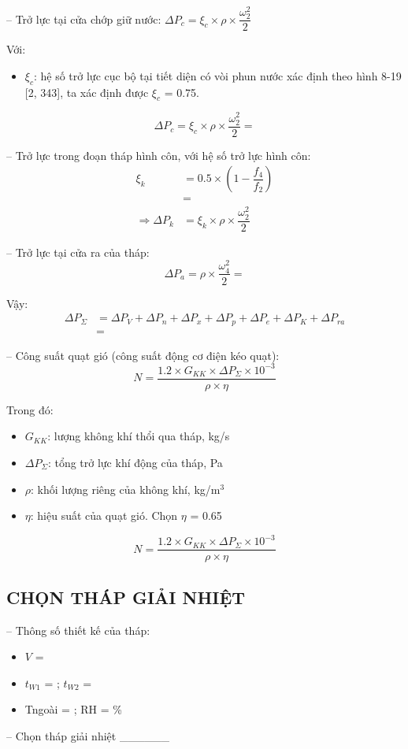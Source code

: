 -- Trở lực tại cửa chớp giữ nước: $\Delta P_{c} = \xi_{c}\times\rho\times\dfrac{\omega_{2}^2}{2}$

Với:
\begin{itemize}
	\item $\xi_{c}$: hệ số trở lực cục bộ tại tiết diện có vòi phun nước xác định theo hình 8-19 [2, 343], ta xác định được $\xi_{c}$ = 0.75.
\end{itemize}
\begin{equation*}
	\Delta P_{c} = \xi_{c}\times\rho\times\dfrac{\omega_{2}^2}{2} = 
\end{equation*}

-- Trở lực trong đoạn tháp hình côn, với hệ số trở lực hình côn:
\begin{equation*}
	\begin{split}
		\xi_{k} &= 0.5\times\left(1-\dfrac{f_{4}}{f_{2}}\right)\\
		&= \\
		\Rightarrow \Delta P_{k} &= \xi_{k}\times\rho\times\dfrac{\omega_{2}^2}{2}
	\end{split}
\end{equation*}

-- Trở lực tại cửa ra của tháp:
\begin{equation*}
	\Delta P_{a} = \rho\times\dfrac{\omega_{4}^{2}}{2} = 
\end{equation*}

Vậy:
\begin{equation*}
	\begin{split}
		\Delta P_{\Sigma} &= \Delta P_{V} + \Delta P_{n} + \Delta P_{x} + \Delta P_{p} + \Delta P_{e} + \Delta P_{K} + \Delta P_{ra}\\
		&=
	\end{split}
\end{equation*}

-- Công suất quạt gió (công suất động cơ điện kéo quạt):
\begin{equation*}
	N = \dfrac{1.2\times G_{KK}\times\Delta P_{\Sigma}\times 10^{-3}}{\rho\times\eta}
\end{equation*}

Trong đó:
\begin{itemize}
	\item $G_{KK}$: lượng không khí thổi qua tháp, kg/s
	\item $\Delta P_{\Sigma}$: tổng trở lực khí động của tháp, Pa
	\item $\rho$: khối lượng riêng của không khí, kg/m$^3$
	\item $\eta$: hiệu suất của quạt gió. Chọn $\eta$ = 0.65
\end{itemize}
\begin{equation*}
	N = \dfrac{1.2\times G_{KK}\times\Delta P_{\Sigma}\times 10^{-3}}{\rho\times\eta}
\end{equation*}

\subsection{CHỌN THÁP GIẢI NHIỆT}
-- Thông số thiết kế của tháp:
\begin{itemize}
	\item $V$ = 
	\item $t_{W1}$ = ; $t_{W2}$ = 
	\item T{\scriptsize ngoài} = ; RH = \%
\end{itemize}

-- Chọn tháp giải nhiệt \_\_\_\_\_\_





